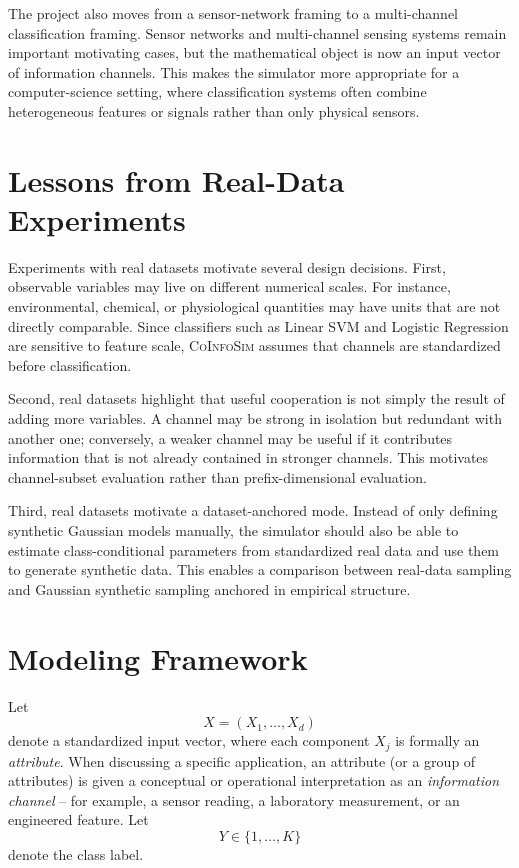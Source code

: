 \documentclass[11pt,a4paper]{article}
\newcommand{\CoInfoSim}{\textsc{CoInfoSim}}
\begin{document}
The project also moves from a sensor-network framing to a multi-channel classification framing. Sensor networks and multi-channel sensing systems remain important motivating cases, but the mathematical object is now an input vector of information channels. This makes the simulator more appropriate for a computer-science setting, where classification systems often combine heterogeneous features or signals rather than only physical sensors.

\section{Lessons from Real-Data Experiments}

Experiments with real datasets motivate several design decisions. First, observable variables may live on different numerical scales. For instance, environmental, chemical, or physiological quantities may have units that are not directly comparable. Since classifiers such as Linear SVM and Logistic Regression are sensitive to feature scale, \CoInfoSim{} assumes that channels are standardized before classification.

Second, real datasets highlight that useful cooperation is not simply the result of adding more variables. A channel may be strong in isolation but redundant with another one; conversely, a weaker channel may be useful if it contributes information that is not already contained in stronger channels. This motivates channel-subset evaluation rather than prefix-dimensional evaluation.

Third, real datasets motivate a dataset-anchored mode. Instead of only defining synthetic Gaussian models manually, the simulator should also be able to estimate class-conditional parameters from standardized real data and use them to generate synthetic data. This enables a comparison between real-data sampling and Gaussian synthetic sampling anchored in empirical structure.

\section{Modeling Framework}

Let
\[
    X=(X_1,\ldots,X_d)
\]
denote a standardized input vector, where each component $X_j$ is formally an \emph{attribute}. When discussing a specific application, an attribute (or a group of attributes) is given a conceptual or operational interpretation as an \emph{information channel} -- for example, a sensor reading, a laboratory measurement, or an engineered feature. Let
\[
    Y\in\{1,\ldots,K\}
\]
denote the class label.
\end{document}
